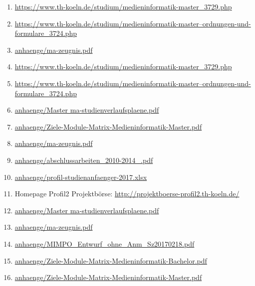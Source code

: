\documentclass[BCOR12mm,DIV11,titlepage,a4paper,oneside,10pt]{scrbook}
\begin{document}
\begin{sloppypar}
\begin{flushleft}
\begin{enumerate}
\item{\href{https://www.th-koeln.de/studium/medieninformatik-master\_3729.php}{https://www.th-koeln.de/studium/medieninformatik-master\_3729.php} } 
\item{\href{https://www.th-koeln.de/studium/medieninformatik-master--ordnungen-und-formulare\_3724.php}{https://www.th-koeln.de/studium/medieninformatik-master--ordnungen-und-formulare\_3724.php} } 
\item{\href{anhaenge/ma-zeugnis.pdf}{anhaenge/ma-zeugnis.pdf} } 
\item{\href{https://www.th-koeln.de/studium/medieninformatik-master\_3729.php}{https://www.th-koeln.de/studium/medieninformatik-master\_3729.php} } 
\item{\href{https://www.th-koeln.de/studium/medieninformatik-master--ordnungen-und-formulare\_3724.php}{https://www.th-koeln.de/studium/medieninformatik-master--ordnungen-und-formulare\_3724.php} } 
\item{\href{anhaenge/Master ma-studienverlaufsplaene.pdf}{anhaenge/Master ma-studienverlaufsplaene.pdf} } 
\item{\href{anhaenge/Ziele-Module-Matrix-Medieninformatik-Master.pdf}{anhaenge/Ziele-Module-Matrix-Medieninformatik-Master.pdf} } 
\item{\href{anhaenge/ma-zeugnis.pdf}{anhaenge/ma-zeugnis.pdf} } 
\item{\href{anhaenge/abschlussarbeiten\_2010-2014\_.pdf}{anhaenge/abschlussarbeiten\_2010-2014\_.pdf} } 
\item{\href{anhaenge/profil-studienanfaenger-2017.xlsx}{anhaenge/profil-studienanfaenger-2017.xlsx} } 
\item{Homepage Profil2 Projektbörse: \href{http://projektboerse-profil2.th-koeln.de/}{http://projektboerse-profil2.th-koeln.de/} } 
\item{\href{anhaenge/Master ma-studienverlaufsplaene.pdf}{anhaenge/Master ma-studienverlaufsplaene.pdf} } 
\item{\href{anhaenge/ma-zeugnis.pdf}{anhaenge/ma-zeugnis.pdf} } 
\item{\href{anhaenge/MIMPO\_Entwurf\_ohne\_Anm\_Sz20170218.pdf}{anhaenge/MIMPO\_Entwurf\_ohne\_Anm\_Sz20170218.pdf} } 
\item{\href{anhaenge/Ziele-Module-Matrix-Medieninformatik-Bachelor.pdf}{anhaenge/Ziele-Module-Matrix-Medieninformatik-Bachelor.pdf} } 
\item{\href{anhaenge/Ziele-Module-Matrix-Medieninformatik-Master.pdf}{anhaenge/Ziele-Module-Matrix-Medieninformatik-Master.pdf} } 

\end{enumerate}
\end{flushleft}
\end{sloppypar}
\end{document}
